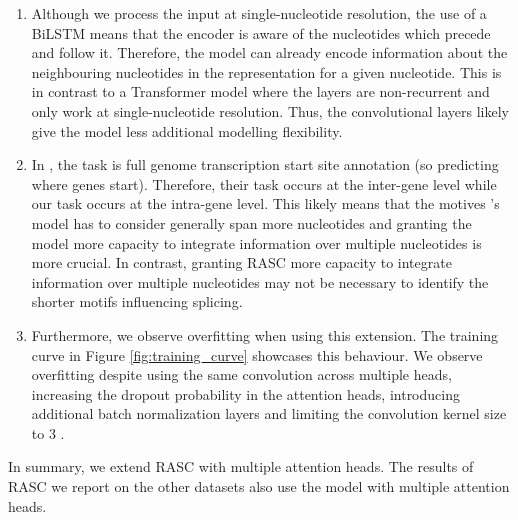 \begin{enumerate}
	\item Although we process the input at single-nucleotide resolution, the use of a BiLSTM means that the encoder is aware of the nucleotides which precede and follow it. Therefore, the model can already encode information about the neighbouring nucleotides in the representation for a given nucleotide. This is in contrast to a Transformer model where the layers are non-recurrent and only work at single-nucleotide resolution. Thus, the convolutional layers likely give the model less additional modelling flexibility.
	\item In \cite{ghentransformers}, the task is full genome transcription start site annotation (so predicting where genes start). Therefore, their task occurs at the inter-gene level while our task occurs at the intra-gene level. This likely means that the motives \cite{ghentransformers}'s model has to consider generally span more nucleotides and granting the model more capacity to integrate information over multiple nucleotides is more crucial. 
	In contrast, granting RASC more capacity to integrate information over multiple nucleotides may not be necessary to identify the shorter motifs influencing splicing. 
	\item Furthermore, we observe overfitting when using this extension. The training curve in Figure \ref{fig:training_curve}
	showcases this behaviour. We observe overfitting despite using the same convolution across multiple heads, increasing the dropout probability in the attention heads, introducing additional batch normalization layers and limiting the convolution kernel size to 3 
	. 
\end{enumerate}


In summary, we extend RASC with multiple attention heads. The results of RASC we report on the other datasets also use the model with multiple attention heads. 




